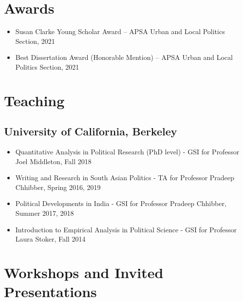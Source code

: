 \documentclass[11pt]{article}
\begin{document}
\vspace{2mm}
\section*{Awards}

\begin{itemize}[nosep]
	\item[] Susan Clarke Young Scholar Award -- APSA Urban and Local Politics Section, 2021
	\item[] Best Dissertation Award (Honorable Mention) --  APSA Urban and Local Politics Section, 2021

\end{itemize}


\vspace{2mm}
\section*{Teaching}

\subsection*{University of California, Berkeley}

\begin{itemize}[nosep]
	\item[]Quantitative Analysis in Political Research (PhD level) - GSI for Professor Joel Middleton, Fall 2018 
		\item[]Writing and Research in South Asian Politics - TA for Professor Pradeep Chhibber, Spring 2016, 2019
	\item[] Political Developments in India - GSI for Professor Pradeep Chhibber, Summer 2017, 2018
	\item[]Introduction to Empirical Analysis in Political Science - GSI for Professor Laura Stoker, Fall 2014	
\end{itemize}

\vspace{2mm}
\section*{Workshops and Invited Presentations}
\end{document}
